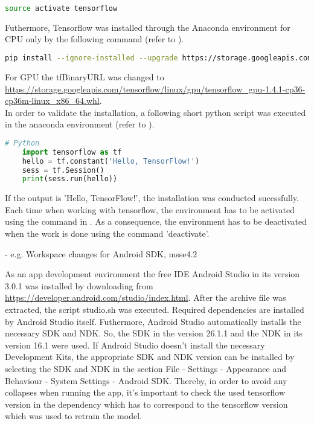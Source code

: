 \begin{lstlisting}[caption=Activating the Anaconda environment, label=list:activation_anaconda, language=bash]
	source activate tensorflow
\end{lstlisting}

Futhermore, Tensorflow was installed through the Anaconda environment for CPU only by the following command (refer to ).

\begin{lstlisting}[caption=Installing Tensorflow through Anaconda, label=list:installing_tensorflow_anaconda, language=bash]
	pip install --ignore-installed --upgrade https://storage.googleapis.com/tensorflow/linux/cpu/	tensorflow-1.4.1-cp36-cp36m-linux_x86_64.whl
\end{lstlisting}

For GPU the tfBinaryURL was changed to \url{https://storage.googleapis.com/tensorflow/linux/gpu/tensorflow_gpu-1.4.1-cp36-cp36m-linux_x86_64.whl}. \\

In order to validate the installation, a following short python script was executed in the anaconda environment (refer to ).

\begin{lstlisting}[caption=Installing Tensorflow through Anaconda, label=list:validation_installation, language=python]
	# Python
	import tensorflow as tf
	hello = tf.constant('Hello, TensorFlow!')
	sess = tf.Session()
	print(sess.run(hello))
\end{lstlisting}

If the output is 'Hello, TensorFlow!', the installation was conducted sucessfully. Each time when working with tensorflow, the environment has to be activated using the command in . As a consequence, the environment has to be deactivated when the work is done using the command 'deactivate'.

				- e.g. Workspace changes for Android SDK, msse4.2
				
As an app development environment the free IDE Android Studio in its version 3.0.1 was installed by downloading from \url{https://developer.android.com/studio/index.html}. After the archive file was extracted, the script studio.sh was executed. Required dependencies are installed by Android Studio itself. Futhermore, Android Studio automatically installs the necessary SDK and NDK. So, the SDK in the version 26.1.1 and the NDK in its version 16.1 were used. If Android Studio doesn't install the necessary Development Kits, the appropriate SDK and NDK version can be installed by selecting the SDK and NDK in the section File - Settings - Appearance and Behaviour - System Settings - Android SDK. Thereby, in order to avoid any collapses when running the app, it's important to check the used tensorflow version in the dependency which has to correspond to the tensorflow version which was used to retrain the model.\\

